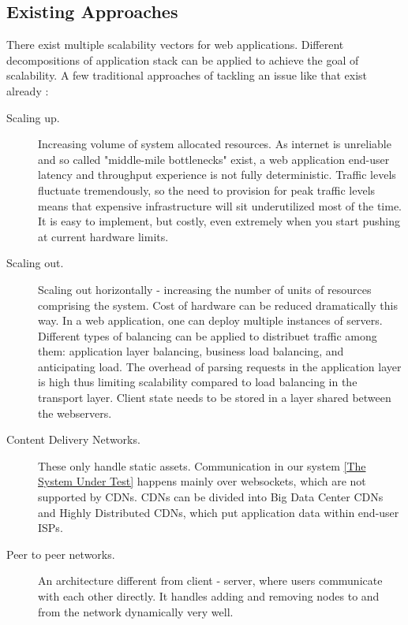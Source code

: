 \documentclass{uvamscse}
\begin{document}
\subsection{Existing Approaches}
There exist multiple scalability vectors for web applications. Different decompositions of application stack can be applied to achieve the goal of scalability. A few traditional approaches of tackling an issue like that exist already \cite{Akamai}:
\begin{description}
  \item[Scaling up.]
  Increasing volume of system allocated resources. As internet is unreliable and so called "middle-mile bottlenecks" exist,
  a web application end-user latency and throughput experience is not fully deterministic. Traffic levels fluctuate tremendously, so the need to provision for peak traffic levels means that expensive infrastructure will sit underutilized most of the time. It is easy to implement, but costly, even extremely when you start pushing at current hardware limits.\cite{Qvef}
  \item[Scaling out.]
  Scaling out horizontally - increasing the number of units of resources comprising the system. Cost of hardware can be reduced dramatically this way. In a web application, one can deploy multiple instances of servers. Different types of balancing can be applied to distribuet traffic among them: application layer balancing, business load balancing, and anticipating load. The overhead of parsing requests in the application layer is high thus limiting scalability compared to load balancing in the transport layer. Client state needs to be stored in a layer shared between the webservers.\cite{Qvef}
  \item[Content Delivery Networks.]
  These only handle static assets. Communication in our system \ref{The System Under Test} happens mainly over websockets, which are not supported by CDNs. CDNs can be divided into Big Data Center CDNs and Highly Distributed CDNs, which put application data within end-user ISPs.\cite{Akamai}
  \item[Peer to peer networks.]
  An architecture different from client - server, where users communicate with each other directly. It handles adding and removing nodes to and from the network dynamically very well.
\end{description}
\end{document}
